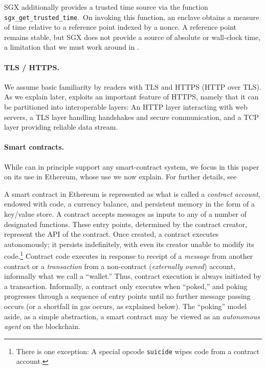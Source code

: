SGX additionally provides a trusted time source via the function \texttt{sgx\_get\_trusted\_time}.~On invoking this function, an enclave obtains a measure of time relative to a reference point indexed by a nonce. A reference point remains stable, but SGX does not provide a source of absolute or wall-clock time, a limitation that we must work around in \tc.

\vspace{-2mm}
\paragraph{\bf TLS / HTTPS.}

We assume basic familiarity by readers with TLS and HTTPS (HTTP over TLS). As we explain later, \tc exploits an important feature of HTTPS, namely that it can be partitioned into interoperable layers: An HTTP layer interacting with web servers, a TLS layer handling handshakes and secure communication, and a TCP layer providing reliable data stream. 

\vspace{-2mm}
\paragraph{\bf Smart contracts.}
\label{sec:contracts-and-gas}

While \tc can in principle support any smart-contract system, we focus in this paper on its use in Ethereum, whose use we now explain. For further details, see~\cite{whitepaper,yellowpaper}

A smart contract in Ethereum is represented as what is called a \emph{contract account}, endowed with code, a currency balance, and persistent memory in the form of a key/value store. A contract accepts messages as inputs to any of a number of designated functions. These entry points, determined by the contract creator, represent the API of the contract. Once created, a contract executes autonomously; it persists indefinitely, with even its creator unable to modify its code.\footnote{There is one exception: A special opcode \texttt{suicide} wipes code from a contract account.} Contract code executes in response to receipt of a \emph{message} from another contract or a \emph{transaction} from a non-contract (\emph{externally owned}) account, informally what we call a ``wallet.'' Thus, contract execution is always initiated by a transaction. Informally, a contract only executes when ``poked,'' and poking progresses through a sequence of entry points until no further message passing occurs (or a shortfall in gas occurs, as explained below). The ``poking'' model aside, as a simple abstraction, a smart contract may be viewed as an {\em autonomous agent} on the blockchain.

